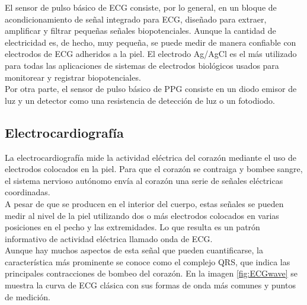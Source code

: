	El sensor de pulso básico de ECG consiste, por lo general, en un bloque de acondicionamiento de señal integrado para ECG, diseñado para extraer, amplificar y filtrar pequeñas señales biopotenciales. Aunque la cantidad de electricidad es, de hecho, muy pequeña, se puede medir de manera confiable con electrodos de ECG adheridos a la piel. El electrodo Ag/AgCl es el más utilizado para todas las aplicaciones de sistemas de electrodos biológicos usados para monitorear y registrar biopotenciales. \cite{naylampECG} \cite{imotionsECG} \cite{salvatore2011} \\
	
	Por otra parte, el sensor de pulso básico de PPG consiste en un diodo emisor de luz y un detector como una resistencia de detección de luz o un fotodiodo. \cite{agarwalHS}

	\subsection{Electrocardiografía}
		La electrocardiografía mide la actividad eléctrica del corazón mediante el uso de electrodos colocados en la piel. Para que el corazón se contraiga y bombee sangre, el sistema nervioso autónomo envía al corazón una serie de señales eléctricas coordinadas. \\
		
		A pesar de que se producen en el interior del cuerpo, estas señales se pueden medir al nivel de la piel utilizando dos o más electrodos colocados en varias posiciones en el pecho y las extremidades. Lo que resulta es un patrón informativo de actividad eléctrica llamado onda de ECG. \\
		
		Aunque hay muchos aspectos de esta señal que pueden cuantificarse, la característica más prominente se conoce como el complejo QRS, que indica las principales contracciones de bombeo del corazón. En la imagen \ref{fig:ECGwave} se muestra la curva de ECG clásica con sus formas de onda más comunes y puntos de medición. \\
		
